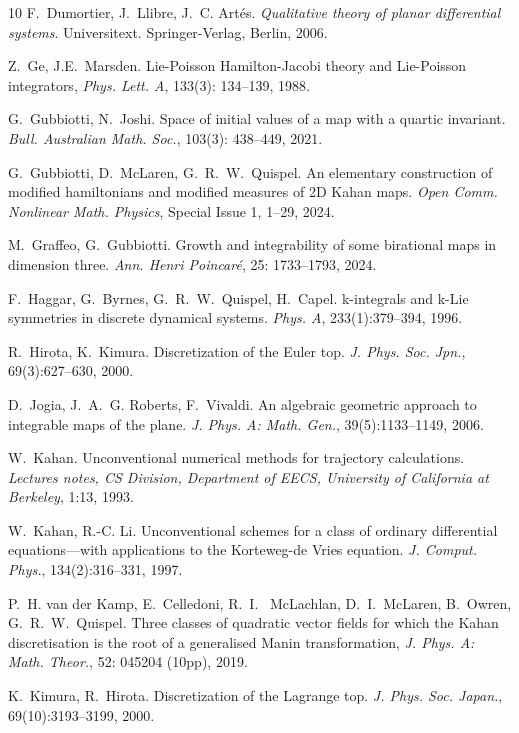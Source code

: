 \documentclass[11pt]{article}
\begin{document}
\begin{thebibliography}{10}
F.~Dumortier, J.~Llibre, J.~C. Art\'{e}s.
{\em Qualitative theory of planar differential systems}.
 Universitext. Springer-Verlag, Berlin, 2006.

 Z.~Ge, J.E.~Marsden. Lie-Poisson Hamilton-Jacobi theory and Lie-Poisson integrators,
{\em Phys. Lett. A}, 133(3): 134--139, 1988.

 G.~Gubbiotti, N.~Joshi. Space of initial values of a map with a quartic invariant. {\em Bull. Australian Math. Soc.}, 103(3): 438--449, 2021. 

G.~Gubbiotti, D.~McLaren, G.~R.~W.~Quispel. An elementary construction of modified hamiltonians and modified measures of 2D Kahan maps. {\em Open Comm. Nonlinear Math. Physics}, Special Issue 1, 1--29, 2024.

 M.~Graffeo, G.~Gubbiotti. Growth and integrability of some birational maps in dimension three. {\em Ann. Henri Poincar\'e}, 25: 1733--1793, 2024.

F.~Haggar, G.~Byrnes, G.~R.~W.~Quispel, H.~Capel.
 k-integrals and k-Lie symmetries in discrete dynamical systems.
 {\em Phys. A},
  233(1):379--394, 1996.

R.~Hirota, K.~Kimura.
 Discretization of the Euler top.
 {\em J. Phys. Soc. Jpn.}, 69(3):627--630, 2000.

D.~Jogia, J.~A.~G. Roberts, F.~Vivaldi.
 An algebraic geometric approach to integrable maps of the plane.
 {\em J. Phys. A: Math. Gen.}, 39(5):1133--1149, 2006.

W.~Kahan.
 Unconventional numerical methods for trajectory calculations.
 {\em Lectures notes, CS Division, Department of EECS, University of
  California at Berkeley}, 1:13, 1993.

W.~Kahan, R.-C. Li.
 Unconventional schemes for a class of ordinary differential
  equations---with applications to the {K}orteweg-de {V}ries equation.
 {\em J. Comput. Phys.}, 134(2):316--331, 1997.
 
 P.~H. van der Kamp, E.~Celledoni, R.~I.~ McLachlan, D.~I.~McLaren, B.~Owren, G.~R.~W.~Quispel. Three classes of quadratic vector fields for which the Kahan discretisation is the root of a generalised Manin transformation, {\em J. Phys. A: Math. Theor.}, 52: 045204 (10pp), 2019.


K.~Kimura, R.~Hirota.
 Discretization of the Lagrange top.
 {\em J. Phys. Soc. Japan.}, 69(10):3193--3199,
  2000.
  


\end{thebibliography}
\end{document}
